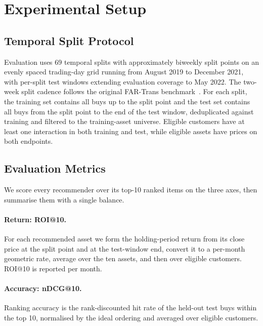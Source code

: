 \section{Experimental Setup}
\label{sec:exp}

\subsection{Temporal Split Protocol}
\label{sec:exp:splits}
Evaluation uses 69 temporal splits with approximately biweekly split points on an evenly spaced trading-day grid running from August 2019 to December 2021, with per-split test windows extending evaluation coverage to May 2022. The two-week split cadence follows the original FAR-Trans benchmark~\cite{sanzcruzado2024fartransinvestmentdatasetfinancial}. For each split, the training set contains all buys up to the split point and the test set contains all buys from the split point to the end of the test window, deduplicated against training and filtered to the training-asset universe. Eligible customers have at least one interaction in both training and test, while eligible assets have prices on both endpoints.

\subsection{Evaluation Metrics}
\label{sec:exp:metrics}
We score every recommender over its top-10 ranked items on the three axes, then summarise them with a single balance.

\paragraph{Return: ROI@10.} For each recommended asset we form the holding-period return from its close price at the split point and at the test-window end, convert it to a per-month geometric rate, average over the ten assets, and then over eligible customers. ROI@10 is reported per month.

\paragraph{Accuracy: nDCG@10.} Ranking accuracy is the rank-discounted hit rate of the held-out test buys within the top 10, normalised by the ideal ordering and averaged over eligible customers.

